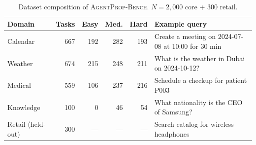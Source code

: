 \begin{table}[t]
\centering
\caption{Dataset composition of \textsc{AgentProp-Bench}. $N = 2{,}000$ core + 300 retail.}
\label{tab:dataset}
\small
\begin{tabular}{l r r r r p{4.5cm}}
\toprule
Domain & Tasks & Easy & Med. & Hard & Example query \\
\midrule
Calendar & 667 & 192 & 282 & 193 & Create a meeting on 2024-07-08 at 10:00 for 30 min \\
Weather & 674 & 215 & 248 & 211 & What is the weather in Dubai on 2024-10-12? \\
Medical & 559 & 106 & 237 & 216 & Schedule a checkup for patient P003 \\
Knowledge & 100 & 0 & 46 & 54 & What nationality is the CEO of Samsung? \\
\midrule
Retail (held-out) & 300 & --- & --- & --- & Search catalog for wireless headphones \\
\bottomrule
\end{tabular}
\end{table}
